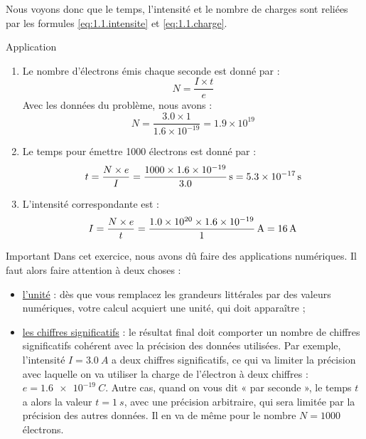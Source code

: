 \documentclass[../main/main.tex]{subfiles}
\begin{document}
Nous voyons donc que le temps, l'intensité et le nombre de charges sont reliées
par les formules \ref{eq:1.1.intensite} et \ref{eq:1.1.charge}.

\begin{NCexem}{Application}
	\begin{enumerate}
		\item Le nombre d'électrons émis chaque seconde est donné par :
		\begin{equation}
			N = \frac{I \times t}{e}
		\end{equation}
		Avec les données du problème, nous avons :
		\begin{equation}
			N = \dfrac{3.0 \times 1}{1.6\times 10^{-19}} = 1.9\times 10^{19}
		\end{equation}
		\item Le temps pour émettre 1000 électrons est donné par :
		\begin{equation}
            t = \dfrac{N\times e}{I} = \dfrac{1000 \times 1.6\times
            10^{-19}}{3.0}\,{\rm s} = \SI{5.3e-17}{s}
		\end{equation}
		\item L'intensité correspondante est :
		\begin{equation}
            I = \dfrac{N\times e}{t} = \dfrac{1.0\times 10^{20} \times 1.6\times
            10^{-19}}{1}\,{\rm A} = \SI{16}{A}
		\end{equation}
	\end{enumerate}
\end{NCexem}

\begin{impo}{Important}
    Dans cet exercice, nous avons dû faire des applications numériques. Il faut
    alors faire attention à deux choses :
	\begin{itemize}
        \item \underline{l'unité} : dès que vous remplacez les grandeurs
            littérales par des valeurs numériques, votre calcul acquiert une
            unité, qui doit apparaître ;
        \item \underline{les chiffres significatifs} : le résultat final doit
            comporter un nombre de chiffres significatifs cohérent avec la
            précision des données utilisées. Par exemple, l'intensité $I =
            \SI{3.0}{A}$ a deux chiffres significatifs, ce qui va limiter la
            précision avec laquelle on va utiliser la charge de l'électron à
            deux chiffres : $e = \SI{1.6e-19}{C}$. Autre cas, quand on vous dit
            « par seconde », le temps $t$ a alors la valeur $t = \SI{1}{s}$, avec
            une précision arbitraire, qui sera limitée par la précision des
            autres données. Il en va de même pour le nombre $N = 1000$
            électrons.
	\end{itemize}
\end{impo}
\end{document}
